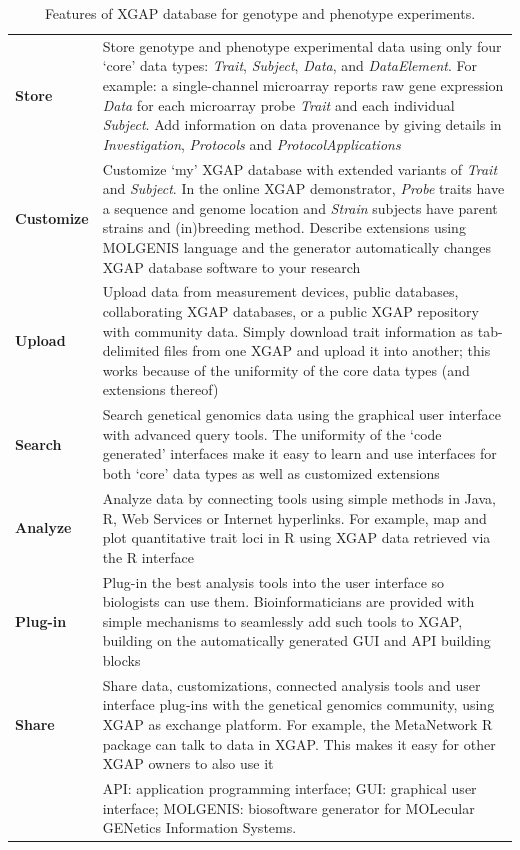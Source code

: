\begin{table}
\footnotesize
\begin{tabularx}{\linewidth}{ l X }
  \hline
  \rule{0pt}{2.5ex}\textbf{Store} & Store genotype and phenotype experimental data using only four ‘core’ data types: \textsl{Trait}, \textsl{Subject}, \textsl{Data}, and \textsl{DataElement}. For example: a single-channel microarray reports raw gene expression \textsl{Data} for each microarray probe \textsl{Trait} and each individual \textsl{Subject}. Add information on data provenance by giving details in \textsl{Investigation}, \textsl{Protocols} and \textsl{ProtocolApplications}\\
  \rule{0pt}{2.5ex}\textbf{Customize} & Customize ‘my’ XGAP database with extended variants of \textsl{Trait} and \textsl{Subject}. In the online XGAP demonstrator, \textsl{Probe} traits have a sequence and genome location and \textsl{Strain} subjects have parent strains and (in)breeding method. Describe extensions using MOLGENIS language and the generator automatically changes XGAP database software to your research\\
  \rule{0pt}{2.5ex}\textbf{Upload} & Upload data from measurement devices, public databases, collaborating XGAP databases, or a public XGAP repository with community data. Simply download trait information as tab-delimited files from one XGAP and upload it into another; this works because of the uniformity of the core data types (and extensions thereof)\\
  \rule{0pt}{2.5ex}\textbf{Search} & Search genetical genomics data using the graphical user interface with advanced query tools. The uniformity of the ‘code generated’ interfaces make it easy to learn and use interfaces for both ‘core’ data types as well as customized extensions\\
  \rule{0pt}{2.5ex}\textbf{Analyze} & Analyze data by connecting tools using simple methods in Java, R, Web Services or Internet hyperlinks. For example, map and plot quantitative trait loci in R using XGAP data retrieved via the R interface\\
  \rule{0pt}{2.5ex}\textbf{Plug-in} & Plug-in the best analysis tools into the user interface so biologists can use them. Bioinformaticians are provided with simple mechanisms to seamlessly add such tools to XGAP, building on the automatically generated GUI and API building blocks\\
  \rule{0pt}{2.5ex}\textbf{Share} & Share data, customizations, connected analysis tools and user interface plug-ins with the genetical genomics community, using XGAP as exchange platform. For example, the MetaNetwork R package can talk to data in XGAP. This makes it easy for other XGAP owners to also use it\\
  \hline
  ~ & {\scriptsize API: application programming interface; GUI: graphical user interface; MOLGENIS: biosoftware generator for MOLecular GENetics Information Systems.}\\
\end{tabularx}
\caption[Features of XGAP database]{Features of XGAP database for genotype and phenotype experiments.}
\label{table:xgap_features}
\end{table}

